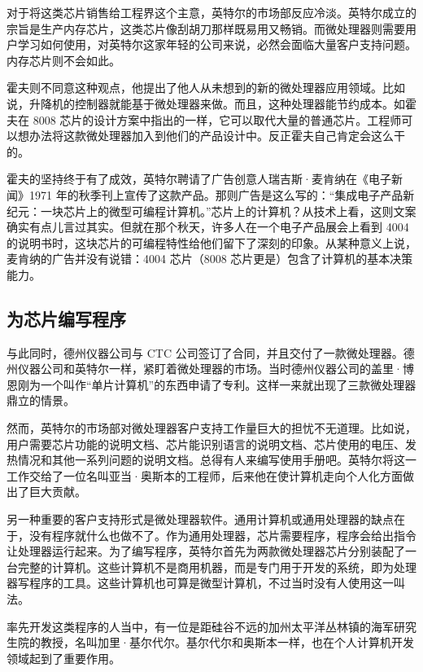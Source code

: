 \documentclass[12pt,UTF8]{ctexbook}
\begin{document}
对于将这类芯片销售给工程界这个主意，英特尔的市场部反应冷淡。英特尔成立的宗旨是生产内存芯片，这类芯片像刮胡刀那样既易用又畅销。而微处理器则需要用户学习如何使用，对英特尔这家年轻的公司来说，必然会面临大量客户支持问题。内存芯片则不会如此。

霍夫则不同意这种观点，他提出了他人从未想到的新的微处理器应用领域。比如说，升降机的控制器就能基于微处理器来做。而且，这种处理器能节约成本。如霍夫在 8008 芯片的设计方案中指出的一样，它可以取代大量的普通芯片。工程师可以想办法将这款微处理器加入到他们的产品设计中。反正霍夫自己肯定会这么干的。

霍夫的坚持终于有了成效，英特尔聘请了广告创意人瑞吉斯·麦肯纳在《电子新闻》1971 年的秋季刊上宣传了这款产品。那则广告是这么写的：“集成电子产品新纪元：一块芯片上的微型可编程计算机。”芯片上的计算机？从技术上看，这则文案确实有点儿言过其实。但就在那个秋天，许多人在一个电子产品展会上看到 4004 的说明书时，这块芯片的可编程特性给他们留下了深刻的印象。从某种意义上说，麦肯纳的广告并没有说错：4004 芯片（8008 芯片更是）包含了计算机的基本决策能力。





\subsection{为芯片编写程序}


与此同时，德州仪器公司与 CTC 公司签订了合同，并且交付了一款微处理器。德州仪器公司和英特尔一样，紧盯着微处理器的市场。当时德州仪器公司的盖里·博恩刚为一个叫作“单片计算机”的东西申请了专利。这样一来就出现了三款微处理器鼎立的情景。

然而，英特尔的市场部对微处理器客户支持工作量巨大的担忧不无道理。比如说，用户需要芯片功能的说明文档、芯片能识别语言的说明文档、芯片使用的电压、发热情况和其他一系列问题的说明文档。总得有人来编写使用手册吧。英特尔将这一工作交给了一位名叫亚当·奥斯本的工程师，后来他在使计算机走向个人化方面做出了巨大贡献。

另一种重要的客户支持形式是微处理器软件。通用计算机或通用处理器的缺点在于，没有程序就什么也做不了。作为通用处理器，芯片需要程序，程序会给出指令让处理器运行起来。为了编写程序，英特尔首先为两款微处理器芯片分别装配了一台完整的计算机。这些计算机不是商用机器，而是专门用于开发的系统，即为处理器写程序的工具。这些计算机也可算是微型计算机，不过当时没有人使用这一叫法。

率先开发这类程序的人当中，有一位是距硅谷不远的加州太平洋丛林镇的海军研究生院的教授，名叫加里·基尔代尔。基尔代尔和奥斯本一样，也在个人计算机开发领域起到了重要作用。
\end{document}
